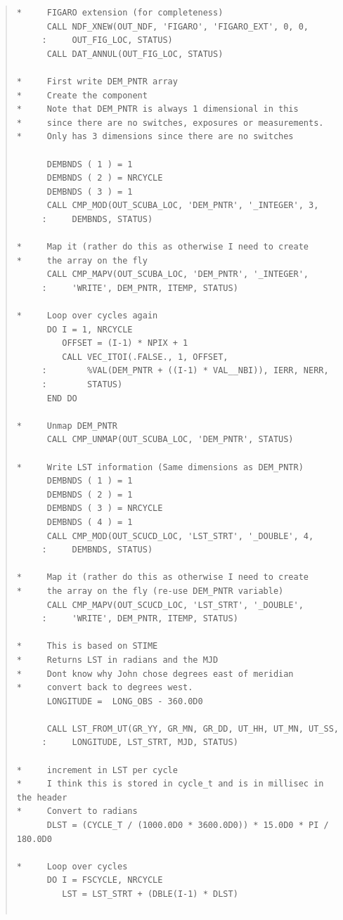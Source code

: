 \documentclass[twoside,11pt]{article}
\newenvironment{myquote}{\begin{quote}\begin{small}}{\end{small}\end{quote}}
\renewcommand{\_}{\texttt{\symbol{95}}}
\begin{document}
\begin{myquote}
\begin{verbatim}
*     FIGARO extension (for completeness)
      CALL NDF_XNEW(OUT_NDF, 'FIGARO', 'FIGARO_EXT', 0, 0,
     :     OUT_FIG_LOC, STATUS)
      CALL DAT_ANNUL(OUT_FIG_LOC, STATUS)

*     First write DEM_PNTR array
*     Create the component
*     Note that DEM_PNTR is always 1 dimensional in this
*     since there are no switches, exposures or measurements.
*     Only has 3 dimensions since there are no switches

      DEMBNDS ( 1 ) = 1
      DEMBNDS ( 2 ) = NRCYCLE
      DEMBNDS ( 3 ) = 1
      CALL CMP_MOD(OUT_SCUBA_LOC, 'DEM_PNTR', '_INTEGER', 3,
     :     DEMBNDS, STATUS)

*     Map it (rather do this as otherwise I need to create
*     the array on the fly
      CALL CMP_MAPV(OUT_SCUBA_LOC, 'DEM_PNTR', '_INTEGER',
     :     'WRITE', DEM_PNTR, ITEMP, STATUS)

*     Loop over cycles again
      DO I = 1, NRCYCLE
         OFFSET = (I-1) * NPIX + 1
         CALL VEC_ITOI(.FALSE., 1, OFFSET,
     :        %VAL(DEM_PNTR + ((I-1) * VAL__NBI)), IERR, NERR,
     :        STATUS)
      END DO

*     Unmap DEM_PNTR
      CALL CMP_UNMAP(OUT_SCUBA_LOC, 'DEM_PNTR', STATUS)

*     Write LST information (Same dimensions as DEM_PNTR)
      DEMBNDS ( 1 ) = 1
      DEMBNDS ( 2 ) = 1
      DEMBNDS ( 3 ) = NRCYCLE
      DEMBNDS ( 4 ) = 1
      CALL CMP_MOD(OUT_SCUCD_LOC, 'LST_STRT', '_DOUBLE', 4,
     :     DEMBNDS, STATUS)

*     Map it (rather do this as otherwise I need to create
*     the array on the fly (re-use DEM_PNTR variable)
      CALL CMP_MAPV(OUT_SCUCD_LOC, 'LST_STRT', '_DOUBLE',
     :     'WRITE', DEM_PNTR, ITEMP, STATUS)

*     This is based on STIME
*     Returns LST in radians and the MJD
*     Dont know why John chose degrees east of meridian
*     convert back to degrees west.
      LONGITUDE =  LONG_OBS - 360.0D0

      CALL LST_FROM_UT(GR_YY, GR_MN, GR_DD, UT_HH, UT_MN, UT_SS,
     :     LONGITUDE, LST_STRT, MJD, STATUS)

*     increment in LST per cycle
*     I think this is stored in cycle_t and is in millisec in the header
*     Convert to radians
      DLST = (CYCLE_T / (1000.0D0 * 3600.0D0)) * 15.0D0 * PI / 180.0D0

*     Loop over cycles
      DO I = FSCYCLE, NRCYCLE
         LST = LST_STRT + (DBLE(I-1) * DLST)


\end{verbatim}
\end{myquote}
\end{document}
